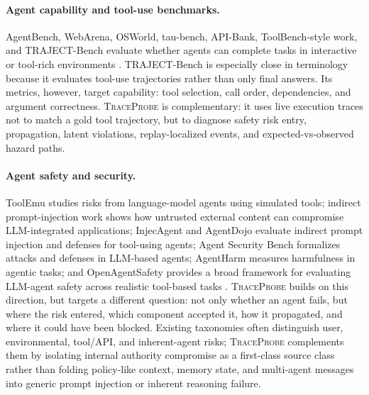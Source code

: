 \documentclass[11pt]{article}
\newcommand{\tp}{\textsc{TraceProbe}}
\begin{document}
\paragraph{Agent capability and tool-use benchmarks.}
AgentBench, WebArena, OSWorld, tau-bench, API-Bank, ToolBench-style work, and TRAJECT-Bench evaluate whether agents can complete tasks in interactive or tool-rich environments \citep{agentbench,webarena,osworld,taubench,apibank,toolbench,trajectbench}.
TRAJECT-Bench is especially close in terminology because it evaluates tool-use trajectories rather than only final answers.
Its metrics, however, target capability: tool selection, call order, dependencies, and argument correctness.
\tp{} is complementary: it uses live execution traces not to match a gold tool trajectory, but to diagnose safety risk entry, propagation, latent violations, replay-localized events, and expected-vs-observed hazard paths.

\paragraph{Agent safety and security.}
ToolEmu studies risks from language-model agents using simulated tools; indirect prompt-injection work shows how untrusted external content can compromise LLM-integrated applications; InjecAgent and AgentDojo evaluate indirect prompt injection and defenses for tool-using agents; Agent Security Bench formalizes attacks and defenses in LLM-based agents; AgentHarm measures harmfulness in agentic tasks; and OpenAgentSafety provides a broad framework for evaluating LLM-agent safety across realistic tool-based tasks \citep{toolemu,indirectpromptinjection,houyi,injecagent,agentdojo,agentsecuritybench,agentharm,openagentsafety}.
\tp{} builds on this direction, but targets a different question: not only whether an agent fails, but where the risk entered, which component accepted it, how it propagated, and where it could have been blocked.
Existing taxonomies often distinguish user, environmental, tool/API, and inherent-agent risks; \tp{} complements them by isolating internal authority compromise as a first-class source class rather than folding policy-like context, memory state, and multi-agent messages into generic prompt injection or inherent reasoning failure.
\end{document}
